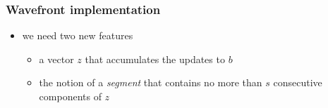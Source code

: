 \begin{frame}[fragile]
%
  \frametitle{Wavefront implementation}
%
  \begin{itemize}
%
  \item we need two new features
    \begin{itemize}
    \item a vector $z$ that accumulates the updates to $b$
    \item the notion of a {\em segment} that contains no more than $s$ consecutive components of $z$
    \end{itemize}
%
  \end{itemize}
%
  \begin{center}
    \begin{minipage}{.85\linewidth}
      \begin{algorithm}[H]
%
          \DontPrintSemicolon
          \NoCaptionOfAlgo
          \SetAlCapHSkip{0ex}
%
%
        \end{algorithm}
      \end{minipage}
    \end{center}
%
\end{frame}




